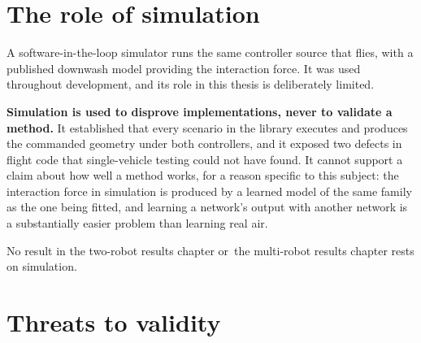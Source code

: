 \section{The role of simulation}
\label{sec:setup-sim}

A software-in-the-loop simulator runs the same controller source that flies, with a published
downwash model providing the interaction force. It was used throughout development, and its role in
this thesis is deliberately limited.

\textbf{Simulation is used to disprove implementations, never to validate a method.} It established
that every scenario in the library executes and produces the commanded geometry under both
controllers, and it exposed two defects in flight code that single-vehicle testing could not have
found. It cannot support a claim about how well a method works, for a reason specific to this
subject: the interaction force in simulation is produced by a learned model of the same family as
the one being fitted, and learning a network's output with another network is a substantially
easier problem than learning real air.

No result in the two-robot results chapter or~the multi-robot results chapter rests on simulation.

\section{Threats to validity}
\label{sec:setup-validity}

